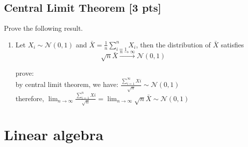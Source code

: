 \documentclass[a4paper]{article}
\theoremstyle{definition}
\newenvironment{soln}{
	\leavevmode\color{blue}\ignorespaces
}{}
\begin{document}
	\subsection{Central Limit Theorem [3 pts]}
	Prove the following result.
	\begin{enumerate}
		\item Let $X_i\sim\mathcal{N}(0, 1)$ and $\bar{X} = \frac{1}{n}\sum_{i=1}^n X_i$, then the distribution of $\bar{X}$ satisfies 
		$$\sqrt{n}\bar{X}\overset{n\rightarrow\infty}{\longrightarrow}\mathcal{N}(0, 1)$$
		
		\begin{soln}
			prove: \\  
			by central limit theorem, we have: $\frac{\sum_{i = 1}^{\infty} Xi }{\sqrt{n}} \sim\mathcal{N}(0, 1)$ \\
			therefore, $\lim_{n \to \infty}\frac{\sum_{i = 1}^{n}Xi}{\sqrt{n}} = \lim_{n \to \infty}\sqrt{n}\bar{X}\sim \mathcal{N}(0, 1)$
		\end{soln}
		
	\end{enumerate}
	
	
	
	\section{Linear algebra}
	
	
\end{document}
